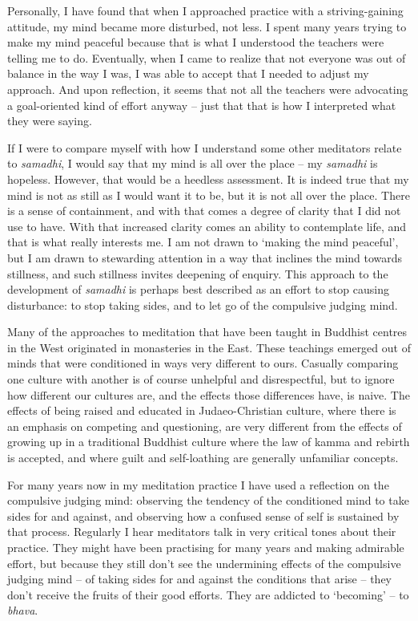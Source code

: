 Personally, I have found that when I approached practice with a
striving-gaining attitude, my mind became more disturbed, not less. I
spent many years trying to make my mind peaceful because that is what I
understood the teachers were telling me to do. Eventually, when I came
to realize that not everyone was out of balance in the way I was, I was
able to accept that I needed to adjust my approach. And upon reflection,
it seems that not all the teachers were advocating a goal-oriented kind
of effort anyway -- just that that is how I interpreted what they were
saying.

If I were to compare myself with how I understand some other meditators
relate to \emph{samadhi}, I would say that my mind is all over the place
-- my \emph{samadhi} is hopeless. However, that would be a heedless
assessment. It is indeed true that my mind is not as still as I would
want it to be, but it is not all over the place. There is a sense of
containment, and with that comes a degree of clarity that I did not use
to have. With that increased clarity comes an ability to contemplate
life, and that is what really interests me. I am not drawn to `making
the mind peaceful', but I am drawn to stewarding attention in a way that
inclines the mind towards stillness, and such stillness invites
deepening of enquiry. This approach to the development of \emph{samadhi}
is perhaps best described as an effort to stop causing disturbance: to
stop taking sides, and to let go of the compulsive judging mind.

Many of the approaches to meditation that have been taught in Buddhist
centres in the West originated in monasteries in the East. These
teachings emerged out of minds that were conditioned in ways very
different to ours. Casually comparing one culture with another is of
course unhelpful and disrespectful, but to ignore how different our
cultures are, and the effects those differences have, is naive. The
effects of being raised and educated in Judaeo-Christian culture, where
there is an emphasis on competing and questioning, are very different
from the effects of growing up in a traditional Buddhist culture where
the law of kamma and rebirth is accepted, and where guilt and
self-loathing are generally unfamiliar concepts.

For many years now in my meditation practice I have used a reflection on
the compulsive judging mind: observing the tendency of the conditioned
mind to take sides for and against, and observing how a confused sense
of self is sustained by that process. Regularly I hear meditators talk
in very critical tones about their practice. They might have been
practising for many years and making admirable effort, but because they
still don't see the undermining effects of the compulsive judging mind
-- of taking sides for and against the conditions that arise -- they
don't receive the fruits of their good efforts. They are addicted to
`becoming' -- to \emph{bhava}.

